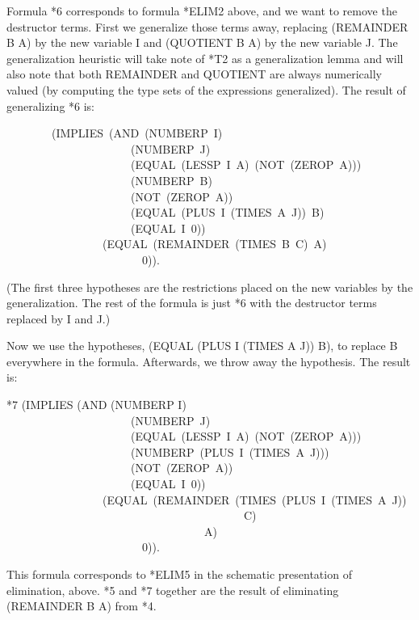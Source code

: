 \documentclass[10pt]{book}
\newenvironment{pubasis}{\begin{flushleft}}{\end{flushleft}}
\begin{document}
Formula *6 corresponds to formula *ELIM2 above, and we want to remove the
destructor terms.  First we generalize those terms away, replacing
(REMAINDER B A) by the new variable I and (QUOTIENT B A) by the new
variable J.  The generalization heuristic will take note of *T2 as a
generalization lemma and will also note that both REMAINDER and QUOTIENT
are always numerically valued (by computing the type sets of
the expressions generalized).  The result of generalizing *6 is:

\begin{pubasis}
~~~~~~~~(IMPLIES~(AND~(NUMBERP~I)\\
~~~~~~~~~~~~~~~~~~~~~~(NUMBERP~J)\\
~~~~~~~~~~~~~~~~~~~~~~(EQUAL~(LESSP~I~A)~(NOT~(ZEROP~A)))\\
~~~~~~~~~~~~~~~~~~~~~~(NUMBERP~B)\\
~~~~~~~~~~~~~~~~~~~~~~(NOT~(ZEROP~A))\\
~~~~~~~~~~~~~~~~~~~~~~(EQUAL~(PLUS~I~(TIMES~A~J))~B)\\
~~~~~~~~~~~~~~~~~~~~~~(EQUAL~I~0))\\
~~~~~~~~~~~~~~~~~(EQUAL~(REMAINDER~(TIMES~B~C)~A)\\
~~~~~~~~~~~~~~~~~~~~~~~~0)).\\
\end{pubasis}
(The first three hypotheses are the restrictions placed on the new
variables by the generalization.  The rest of the
formula is just *6 with the destructor terms replaced by I and J.)

Now we use the hypotheses, (EQUAL (PLUS I (TIMES A J)) B), to
replace B everywhere in the formula.  Afterwards, we throw away the
hypothesis.  The result is:

\begin{pubasis}
*7	(IMPLIES (AND (NUMBERP I)\\
~~~~~~~~~~~~~~~~~~~~~~(NUMBERP~J)\\
~~~~~~~~~~~~~~~~~~~~~~(EQUAL~(LESSP~I~A)~(NOT~(ZEROP~A)))\\
~~~~~~~~~~~~~~~~~~~~~~(NUMBERP~(PLUS~I~(TIMES~A~J)))\\
~~~~~~~~~~~~~~~~~~~~~~(NOT~(ZEROP~A))\\
~~~~~~~~~~~~~~~~~~~~~~(EQUAL~I~0))\\
~~~~~~~~~~~~~~~~~(EQUAL~(REMAINDER~(TIMES~(PLUS~I~(TIMES~A~J))\\
~~~~~~~~~~~~~~~~~~~~~~~~~~~~~~~~~~~~~~~~~~C)\\
~~~~~~~~~~~~~~~~~~~~~~~~~~~~~~~~~~~A)\\
~~~~~~~~~~~~~~~~~~~~~~~~0)).\\
\end{pubasis}
This formula corresponds to *ELIM5 in the  schematic presentation
of elimination, above.  *5 and *7 together are the result of eliminating
(REMAINDER B A) from *4. 
\end{document}
